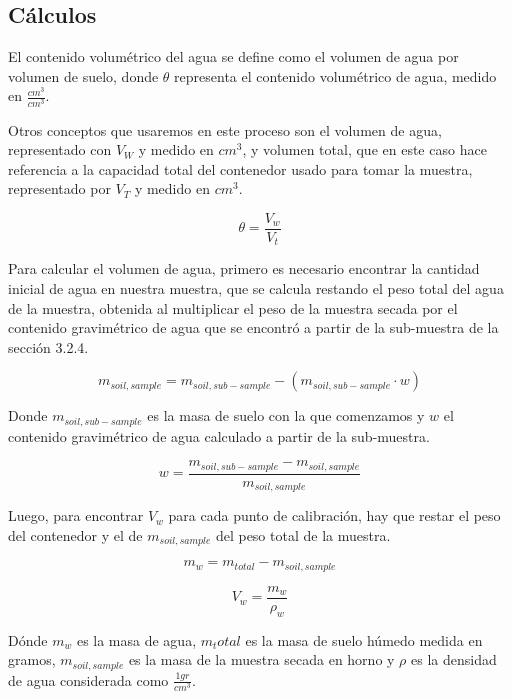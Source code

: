 \subsection{Cálculos}

El contenido volumétrico del agua se define como el volumen de agua por volumen de suelo, donde $\theta$ representa el contenido volumétrico de agua, medido en $\frac{cm^3}{cm^3}$.

Otros conceptos que usaremos en este proceso son el volumen de agua, representado con $V_W$ y medido en $cm^3$, y volumen total, que en este caso hace referencia a la capacidad total del contenedor usado para tomar la muestra, representado por $V_T$ y medido en $cm^3$.

\begin{equation}
    \theta = \frac{V_w}{V_t}
    \label{eqn:cont_volum}
\end{equation}

Para calcular el volumen de agua, primero es necesario encontrar la cantidad inicial de agua en nuestra muestra, que se calcula restando el peso total del agua de la muestra, obtenida al multiplicar el peso de la muestra secada por el contenido gravimétrico de agua que se encontró a partir de la sub-muestra de la sección 3.2.4.

\begin{equation}
    m_{soil, sample} = m_{soil, sub-sample} - (m_{soil, sub-sample} \cdot w)
\end{equation}

Donde $m_{soil, sub-sample}$ es la masa de suelo con la que comenzamos y $w$ el contenido gravimétrico de agua calculado a partir de la sub-muestra.

\begin{equation}
    w = \frac{m_{soil, sub-sample}-m_{soil, sample}}{m_{soil, sample}}
\end{equation}

Luego, para encontrar $V_w$ para cada punto de calibración, hay que restar el peso del contenedor y el de $m_{soil, sample}$ del peso total de la muestra.

\begin{equation}
    m_w=m_{total}-m_{soil, sample}
\end{equation}

\begin{equation}
    V_w=\frac{m_w}{\rho_w}
\end{equation}

Dónde $m_w$ es la masa de agua, $m_total$ es la masa de suelo húmedo medida en gramos, $m_{soil, sample}$ es la masa de la muestra secada en horno y $\rho$ es la densidad de agua considerada como $\frac{1gr}{cm^3}$.

